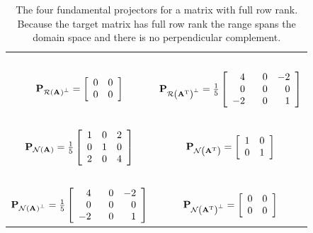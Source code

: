 \begin{table}[htdp]
\begin{center}
\begin{tabular}{cc}
\ \\
 $\projrap = \mat{cc}{0&0\\0&0}$ & $\projratp = \frac{1}{5}\mat{rrr}{4&0&-2\\0&\phantom{-}0&0\\-2&0&1}$ \\
\ \\
 $\projna = \frac{1}{5}\mat{ccc}{1&0&2\\0&1&0\\2&0&4}$ & $\projnat = \itwo$ \\
\ \\
 $\projnap = \frac{1}{5}\mat{rrr}{4&0&-2\\0&\phantom{-}0&0\\-2&0&1}$ & $\projnatp = \mat{cc}{0&0\\0&0}$ \\[15pt]
\end{tabular}
\end{center}
\label{tab:proj:b}
\caption{The four fundamental projectors for a matrix with full row rank. Because the target matrix has full row rank the range spans the domain space and  there is no perpendicular complement.}
\end{table}

